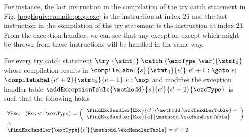 For instance, the last instruction in the compilation of the try catch statement  in Fig. \ref{pogEquiv:compile:prop:exc} 
is the instruction at index 26 and the last instruction in the compilation of the try statement is the instruction at index 21. 
From the exception handler, we can see that any exception except \NullPointerExc{} which might be thrown from these instructions 
will be handled in the same way. 
 
\begin{compProp}\label{compile:prop:compProp10}
For every try catch statement $ \try \ \{ \stmt_1 \} \ \catch \ (\excType \ \var )\{ \stmt_2 \}  $ 
whose compilation  results in 
$ \compileLabel{s}{\stmt_1}{e'}; e' + 1: \goto \ e;  $ $\compileLabel{e' + 2 }{\stmt_2}{e - 1}; e: \nop$
and modifies the exception handler table  
	$\addExceptionTable{\methodd}{ s }{ e'  }{ e' + 2 }{\excType} $
is such that the following holds 
$$\begin{array}{l} \forall \mbox{\rm{\texttt{Exc}}},  \neg ( \mbox{\rm{\texttt{Exc}}} <: \excType ) \Rightarrow
  \left( \begin{array}{l}  
         \findExcHandler{\mbox{\rm\tt{Exc}} }{e'}{\methodd.\excHandlerTable} =\\ 
    \findExcHandler{\mbox{\rm\tt{Exc}} }{e}{\methodd.\excHandlerTable}  \\
   \end{array}\right) \\
   \wedge\\
  \findExcHandler{\excType }{e'}{\methodd.\excHandlerTable} = e'+2 \\ 
 \end{array} $$

\end{compProp}

